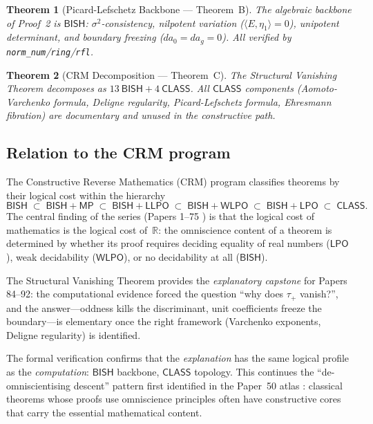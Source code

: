 \documentclass[11pt]{article}
\theoremstyle{plain}
\newtheorem{theorem}{Theorem}[section]
\theoremstyle{definition}
\theoremstyle{remark}
\newcommand{\RR}{\mathbb{R}}
\newcommand{\BISH}{\mathsf{BISH}}
\newcommand{\CLASS}{\mathsf{CLASS}}
\newcommand{\WLPO}{\mathsf{WLPO}}
\newcommand{\LPO}{\mathsf{LPO}}
\begin{document}
\begin{theorem}[Picard-Lefschetz Backbone --- Theorem~B]\label{thm:B}
  The algebraic backbone of Proof~2 is $\BISH$: $\sigma^2$-consistency,
  nilpotent variation ($\langle E, \eta_1\rangle = 0$), unipotent determinant,
  and boundary freezing ($da_0 = da_g = 0$).  All verified by
  \texttt{norm\_num}/\texttt{ring}/\texttt{rfl}.
\end{theorem}

\begin{theorem}[CRM Decomposition --- Theorem~C]\label{thm:C}
  The Structural Vanishing Theorem decomposes as $13~\BISH + 4~\CLASS$.
  All $\CLASS$ components (Aomoto-Varchenko formula, Deligne regularity,
  Picard-Lefschetz formula, Ehresmann fibration) are documentary and unused
  in the constructive path.
\end{theorem}

\subsection{Relation to the CRM program}

The Constructive Reverse Mathematics (CRM) program classifies theorems by
their logical cost within the hierarchy
\[
  \BISH \;\subset\; \BISH{+}\mathsf{MP} \;\subset\;
  \BISH{+}\mathsf{LLPO} \;\subset\; \BISH{+}\WLPO \;\subset\;
  \BISH{+}\LPO \;\subset\; \CLASS.
\]
The central finding of the series (Papers 1--75 \cite{bishop,bridges-richman})
is that the logical cost of mathematics is the logical cost of~$\RR$:
the omniscience content of a theorem is determined by whether its proof
requires deciding equality of real numbers ($\LPO$), weak decidability
($\WLPO$), or no decidability at all ($\BISH$).

The Structural Vanishing Theorem provides the \emph{explanatory capstone}
for Papers 84--92: the computational evidence forced the question ``why
does $\tau_+$ vanish?'', and the answer---oddness kills the discriminant,
unit coefficients freeze the boundary---is elementary once the right
framework (Varchenko exponents, Deligne regularity) is identified.

The formal verification confirms that the \emph{explanation} has the same
logical profile as the \emph{computation}: $\BISH$ backbone, $\CLASS$ topology.
This continues the ``de-omniscientising descent'' pattern first identified
in the Paper~50 atlas \cite{voisin-hodge}: classical theorems whose
proofs use omniscience principles often have constructive cores that
carry the essential mathematical content.
\end{document}
